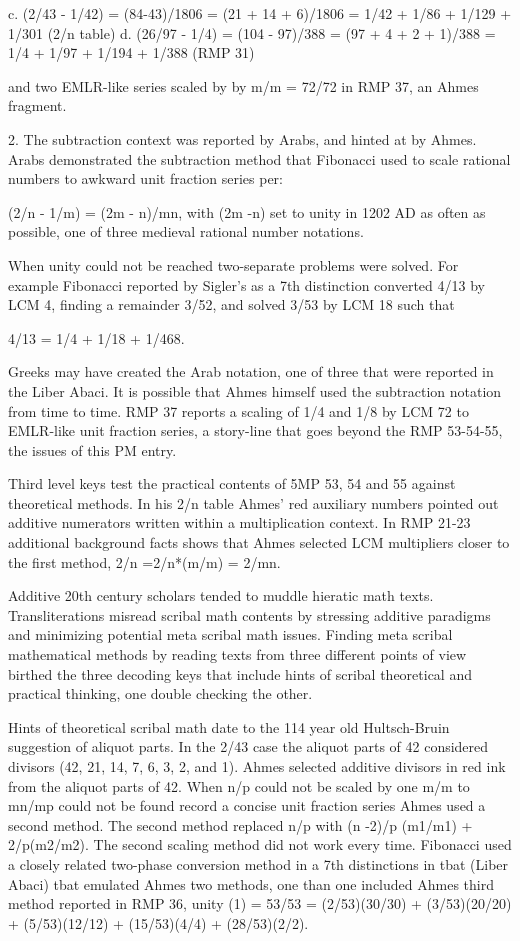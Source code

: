 \documentclass[12pt]{article}
\begin{document}
c. (2/43 - 1/42) = (84-43)/1806 =  (21 + 14 + 6)/1806 = 1/42 + 1/86 + 1/129 + 1/301  (2/n table)
d. (26/97 - 1/4) = (104 - 97)/388 = (97 + 4 + 2 + 1)/388 = 1/4 + 1/97 + 1/194 + 1/388 (RMP 31)

and two EMLR-like series scaled by  by m/m = 72/72 in RMP 37, an Ahmes fragment. 

2. The subtraction context was reported by Arabs, and hinted at by Ahmes. Arabs demonstrated the subtraction method that Fibonacci used to scale rational numbers to awkward unit fraction series per:

(2/n - 1/m) = (2m - n)/mn, with (2m -n) set to unity in 1202 AD as often as possible, one of three medieval rational number notations.

When unity could not be reached two-separate problems were solved. For example Fibonacci reported by Sigler's as a 7th distinction converted 4/13 by LCM 4, finding a remainder 3/52, and solved 3/53 by LCM 18 such that 

4/13 = 1/4 + 1/18 + 1/468. 

Greeks may have created the Arab notation, one of three that were reported in the Liber Abaci. It is possible that Ahmes himself used the subtraction notation from time to time. RMP 37 reports a scaling of 1/4 and 1/8 by LCM 72 to EMLR-like unit fraction series, a story-line that goes beyond the RMP 53-54-55, the issues of this PM entry.

Third level keys test the practical contents of 5MP 53, 54 and 55 against theoretical methods. In his 2/n table Ahmes' red auxiliary numbers pointed out additive numerators written within a multiplication context. In RMP 21-23 additional background facts shows that Ahmes selected LCM multipliers closer to the first method, 2/n =2/n*(m/m) = 2/mn.

Additive 20th century scholars tended to muddle hieratic math texts. Transliterations misread scribal math contents by stressing additive paradigms and minimizing potential meta scribal math issues. Finding meta scribal mathematical methods by reading texts from three different points of view birthed the three decoding keys that include hints of scribal theoretical and practical thinking, one double checking the other.

Hints of theoretical scribal math date to the 114 year old Hultsch-Bruin suggestion of aliquot parts. In the 2/43 case the aliquot parts of 42 considered divisors (42, 21, 14, 7, 6, 3, 2, and 1). Ahmes selected additive divisors in red ink from the aliquot parts of 42. When n/p could not be scaled by one m/m to mn/mp could not be found record a concise unit fraction series Ahmes used a second method. The second method replaced n/p with (n -2)/p (m1/m1) + 2/p(m2/m2). The second scaling method did not work every time. Fibonacci used a closely related two-phase conversion method in a 7th distinctions in tbat (Liber Abaci) tbat emulated Ahmes two methods,  one than one included Ahmes third method reported in RMP 36, unity (1) = 53/53 = (2/53)(30/30) + (3/53)(20/20) + (5/53)(12/12) + (15/53)(4/4) +  (28/53)(2/2). 
\end{document}

